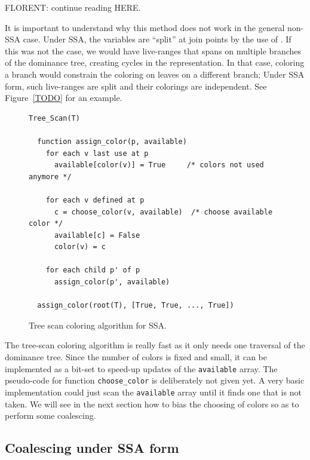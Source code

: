 {FLORENT: continue reading HERE.

\begin{important}
It is important to understand why this method does not work in the general non-SSA case.
Under SSA, the variables are ``split'' at join points by the use of \phifuns.
If this was not the case, we would have live-ranges that spans on multiple branches of the dominance tree, creating cycles in the representation.
In that case, coloring a branch would constrain the coloring on leaves on a different branch; Under SSA form, such live-ranges are split and their colorings are independent.
See Figure~\ref{TODO} for an example.
\end{important}


\begin{figure}
  \begin{verbatim}
Tree_Scan(T)

  function assign_color(p, available)
    for each v last use at p
      available[color(v)] = True     /* colors not used anymore */

    for each v defined at p
      c = choose_color(v, available)  /* choose available color */
      available[c] = False
      color(v) = c

    for each child p' of p
      assign_color(p', available)

  assign_color(root(T), [True, True, ..., True])

  \end{verbatim}
  \caption{Tree scan coloring algorithm for SSA.}
  \label{code:assign-tree-scan}
\end{figure}


The tree-scan coloring algorithm is really fast as it only needs one traversal of the dominance tree. 
Since the number of colors is fixed and small, it can be implemented as a bit-set to speed-up updates of the {\tt available} array.
The pseudo-code for function {\tt choose\_color} is deliberately not given yet. 
A very basic implementation could just scan the {\tt available} array until it finds one that is not taken.
We will see in the next section how to bias the choosing of colors so as to perform some coalescing. 
 


\subsection{Coalescing under SSA form}

}
